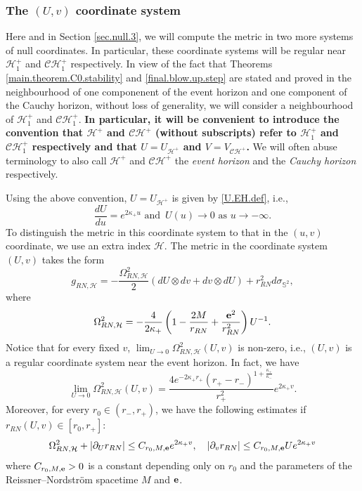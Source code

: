 \documentclass[10pt, reqno]{amsart}
\theoremstyle{definition}
\theoremstyle{remark}
\numberwithin{equation}{section}
\newcommand{\rd}{\partial}
\newcommand{\0}{\emptyset}
\newcommand{\kpp}{\kappa}
\newcommand{\Omg}{\Omega}
\newcommand{\calC}{\mathcal C}
\newcommand{\calH}{\mathcal H}
\newcommand{\f}{\frac}
\newcommand{\CH}{\calC \calH^{+}}		%
\newcommand{\EH}{\calH^{+}}
\begin{document}
\subsubsection{The $(U,v)$ coordinate system}\label{sec.null.2}
Here and in Section \ref{sec.null.3}, we will compute the metric in two more systems of null coordinates. In particular, these coordinate systems will be regular near $\EH_1$ and $\CH_{1}$ respectively. In view of the fact that Theorems \ref{main.theorem.C0.stability} and \ref{final.blow.up.step} are stated and proved in the neighbourhood of one componenent of the event horizon and one component of the Cauchy horizon, without loss of generality, we will consider a neighbourhood of $\EH_1$ and $\CH_1$. {\bf In particular, it will be convenient to introduce the convention that $\EH$ and $\CH$ (without subscripts) refer to $\EH_1$ and $\CH_1$ respectively and that $U=U_{\EH}$ and $V=V_{\CH}$.} We will often abuse terminology to also call $\EH$ and $\CH$ the \emph{event horizon} and the \emph{Cauchy horizon} respectively.

Using the above convention, $U=U_{\EH}$ is given by \eqref{U.EH.def}, i.e.,
\begin{equation}\label{U.def}
\f{dU}{du}=e^{2\kappa_+ u} \mbox{ and }\, U(u)\to 0 \mbox{ as }u\to -\infty.
\end{equation}
To distinguish the metric in this coordinate system to that in the $(u,v)$ coordinate, we use an extra index $\mathcal H$. The metric in the coordinate system $(U,v)$ takes the form
$$g_{RN,\mathcal H}=-\f{\Omg_{RN,\mathcal H}^2}{2} (dU\otimes dv+dv\otimes dU)+ r_{RN}^2 d\sigma_{\mathbb S^2},$$
where 
$$\Omg_{RN,\mathcal H}^2=-\frac{4}{2 \kpp_{+}}\left(1-\f{2M}{r_{RN}}+\f{{\bf e}^2}{r_{RN}^2}\right)U^{-1}.$$ 
Notice that for every fixed $v$, $\lim_{U\to 0} \Omg_{RN,\mathcal H}^2(U,v)$ is non-zero, i.e., $(U,v)$ is a regular coordinate system near the event horizon. In fact, we have
$$\lim_{U\to 0} \Omg_{RN,\mathcal H}^2(U,v)=\f{4e^{-2\kappa_+ r_+}(r_+-r_-)^{1+\f{\kappa_+}{\kappa_-}}}{r_+^2}e^{2\kappa_+ v}.$$
Moreover, for every $r_0\in (r_-,r_+)$, we have the following estimates if $r_{RN}(U,v)\in [r_{0}, r_{+}]$:
\begin{equation}\label{RN.H.bound}
\Omg_{RN,\mathcal H}^2+|\rd_U r_{RN}|\leq C_{r_0, M,{\bf e}}e^{2\kappa_+ v},\quad |\rd_v r_{RN}|\leq C_{r_0, M,{\bf e}}Ue^{2\kappa_+ v}
\end{equation}
where $C_{r_0,M,{\bf e}}>0$ is a constant depending only on $r_0$ and the parameters of the Reissner--Nordstr\"om spacetime $M$ and ${\bf e}$.
\end{document}
